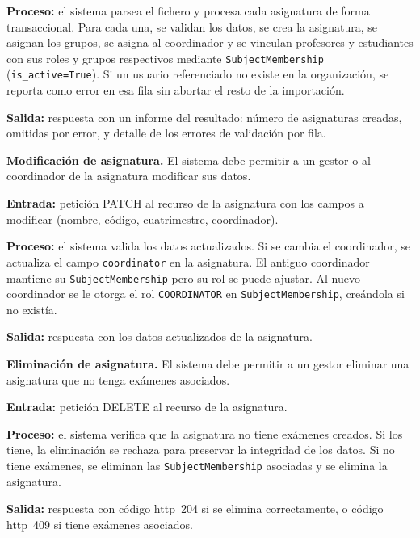 \begin{functional}
    \textbf{Proceso:} el sistema parsea el fichero y procesa cada asignatura de forma
    transaccional. Para cada una, se validan los datos, se crea la asignatura, se asignan
    los grupos, se asigna al coordinador y se vinculan profesores y estudiantes con sus
    roles y grupos respectivos mediante \texttt{SubjectMembership}
    (\texttt{is\_active=True}). Si un usuario referenciado no existe en la organización, se
    reporta como error en esa fila sin abortar el resto de la importación.

    \textbf{Salida:} respuesta con un informe del resultado: número de asignaturas creadas,
    omitidas por error, y detalle de los errores de validación por fila.

    \item \textbf{Modificación de asignatura.} \label{rf:subjects:update}
    El sistema debe permitir a un gestor o al coordinador de la asignatura modificar sus
    datos.

    \textbf{Entrada:} petición PATCH al recurso de la asignatura con los campos a modificar
    (nombre, código, cuatrimestre, coordinador).

    \textbf{Proceso:} el sistema valida los datos actualizados. Si se cambia el coordinador,
    se actualiza el campo \texttt{coordinator} en la asignatura. El antiguo coordinador
    mantiene su \texttt{SubjectMembership} pero su rol se puede ajustar. Al nuevo
    coordinador se le otorga el rol \texttt{COORDINATOR} en \texttt{SubjectMembership},
    creándola si no existía.

    \textbf{Salida:} respuesta con los datos actualizados de la asignatura.

    \item \textbf{Eliminación de asignatura.} \label{rf:subjects:delete}
    El sistema debe permitir a un gestor eliminar una asignatura que no tenga exámenes
    asociados.

    \textbf{Entrada:} petición DELETE al recurso de la asignatura.

    \textbf{Proceso:} el sistema verifica que la asignatura no tiene exámenes creados. Si
    los tiene, la eliminación se rechaza para preservar la integridad de los datos. Si no
    tiene exámenes, se eliminan las \texttt{SubjectMembership} asociadas y se elimina la
    asignatura.

    \textbf{Salida:} respuesta con código \acs{http}~204 si se elimina correctamente, o
    código \acs{http}~409 si tiene exámenes asociados.


\end{functional}
